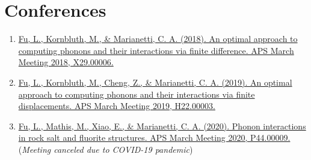 \documentclass[
  a4paper,
  12pt
]{cv}
\begin{document}
\section{Conferences}

\begin{enumerate}
\item
\href{https://meetings.aps.org/Meeting/MAR18/Event/322388}{
Fu, L., Kornbluth, M., \& Marianetti, C. A. (2018).
An optimal approach to computing phonons and their interactions via finite difference.
APS March Meeting 2018, X29.00006.
}
%
\item
\href{https://meetings.aps.org/Meeting/MAR19/Session/H22.3}{
Fu, L., Kornbluth, M., Cheng, Z., \& Marianetti, C. A. (2019).
An optimal approach to computing phonons and their interactions via finite displacements.
APS March Meeting 2019, H22.00003.
}
%
\item
\href{https://meetings.aps.org/Meeting/MAR20/Session/P44.9}{
Fu, L., Mathis, M., Xiao, E., \& Marianetti, C. A. (2020).
Phonon interactions in rock salt and fluorite structures.
APS March Meeting 2020, P44.00009.
} (\emph{Meeting canceled due to COVID-19 pandemic})
\end{enumerate}
\end{document}
